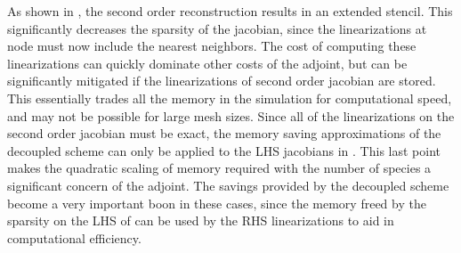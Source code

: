 As shown in , the second order
reconstruction results in an extended stencil.  This significantly decreases the
sparsity of the jacobian, since the linearizations at node must now include the
nearest neighbors.  The cost of computing these linearizations can quickly
dominate other costs of the adjoint, but can be significantly mitigated if the
linearizations of second order jacobian are stored.  This essentially trades all
the memory in the simulation for computational speed, and may not be possible
for large mesh sizes.  Since all of the linearizations on the second order
jacobian must be exact, the memory saving approximations of the decoupled scheme
can only be applied to the LHS jacobians in .  This last
point makes the quadratic scaling of memory required with the number of species
a significant concern of the adjoint.  The savings provided by the decoupled
scheme become a very important boon in these cases, since the memory freed by
the sparsity on the LHS of  can be used by the RHS
linearizations to aid in computational efficiency.
